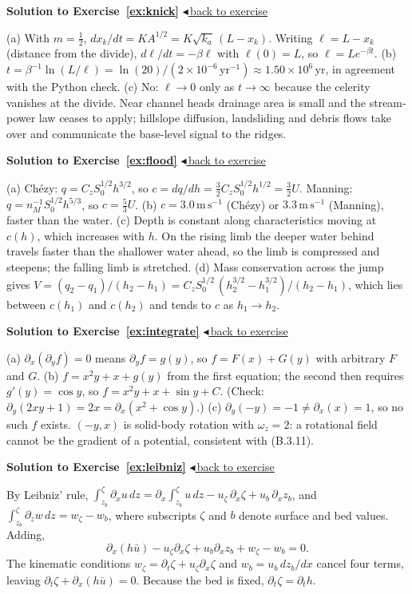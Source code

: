 \documentclass[11pt,letterpaper]{article}
\numberwithin{equation}{section}
\newcommand{\units}[1]{\,\mathrm{#1}}
\newenvironment{solution}[1]{%
  \par\addvspace{1.0ex}\noindent\phantomsection\label{sol:#1}%
  {\color{exorange!85!black}\bfseries Solution to Exercise~\ref{ex:#1}}%
  \hfill\hyperref[ex:#1]{\small$\blacktriangleleft$\,back to exercise}\par\nopagebreak\smallskip}%
  {\par\smallskip\noindent{\color{exorange!40}\rule{\linewidth}{0.4pt}}\par}
\begin{document}
\begin{solution}{knick}
(a) With $m=\tfrac12$, $dx_k/dt=KA^{1/2}=K\sqrt{k_a}\,(L-x_k)$. Writing $\ell=L-x_k$ (distance from the divide), $d\ell/dt=-\beta\ell$ with
$\ell(0)=L$, so $\ell=Le^{-\beta t}$.
(b) $t=\beta^{-1}\ln(L/\ell)=\ln(20)/(2\times10^{-6}\units{yr^{-1}})\approx1.50\times10^{6}\units{yr}$, in agreement with the Python check.
(c) No: $\ell\to0$ only as $t\to\infty$ because the celerity vanishes at the divide. Near channel heads drainage area is small and the stream-power
law ceases to apply; hillslope diffusion, landsliding and debris flows take over and communicate the base-level signal to the ridges.
\end{solution}

\begin{solution}{flood}
(a) Ch\'ezy: $q=C_zS_0^{1/2}h^{3/2}$, so $c=dq/dh=\tfrac32C_zS_0^{1/2}h^{1/2}=\tfrac32U$. Manning: $q=n_M^{-1}S_0^{1/2}h^{5/3}$, so $c=\tfrac53U$.
(b) $c=3.0\units{m\,s^{-1}}$ (Ch\'ezy) or $3.3\units{m\,s^{-1}}$ (Manning), faster than the water.
(c) Depth is constant along characteristics moving at $c(h)$, which increases with $h$. On the rising limb the deeper water behind travels
faster than the shallower water ahead, so the limb is compressed and steepens; the falling limb is stretched.
(d) Mass conservation across the jump gives $V=(q_2-q_1)/(h_2-h_1)=C_zS_0^{1/2}\,(h_2^{3/2}-h_1^{3/2})/(h_2-h_1)$, which lies between $c(h_1)$ and
$c(h_2)$ and tends to $c$ as $h_1\to h_2$.
\end{solution}

\begin{solution}{integrate}
(a) $\partial_x(\partial_yf)=0$ means $\partial_yf=g(y)$, so $f=F(x)+G(y)$ with arbitrary $F$ and $G$.
(b) $f=x^2y+x+g(y)$ from the first equation; the second then requires $g'(y)=\cos y$, so $f=x^2y+x+\sin y+C$. (Check:
$\partial_y(2xy+1)=2x=\partial_x(x^2+\cos y)$.)
(c) $\partial_y(-y)=-1\neq\partial_x(x)=1$, so no such $f$ exists. $(-y,x)$ is solid-body rotation with $\omega_z=2$: a rotational field cannot be the gradient
of a potential, consistent with (B.3.11).
\end{solution}

\begin{solution}{leibniz}
By Leibniz' rule, $\int_{z_b}^{\zeta}\partial_xu\,dz=\partial_x\!\int_{z_b}^{\zeta}u\,dz-u_\zeta\,\partial_x\zeta+u_b\,\partial_xz_b$, and
$\int_{z_b}^{\zeta}\partial_zw\,dz=w_\zeta-w_b$, where subscripts $\zeta$ and $b$ denote surface and bed values. Adding,
\[
\partial_x(h\bar u)-u_\zeta\partial_x\zeta+u_b\partial_xz_b+w_\zeta-w_b=0 .
\]
The kinematic conditions $w_\zeta=\partial_t\zeta+u_\zeta\partial_x\zeta$ and $w_b=u_b\,dz_b/dx$ cancel four terms, leaving
$\partial_t\zeta+\partial_x(h\bar u)=0$. Because the bed is fixed, $\partial_t\zeta=\partial_th$.
\end{solution}
\end{document}
